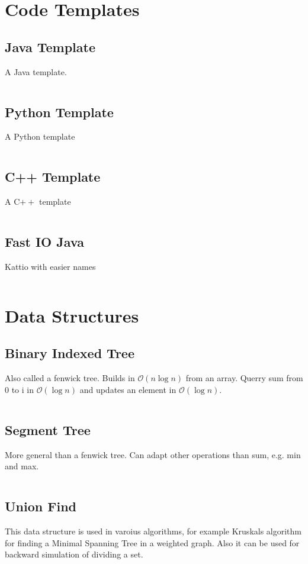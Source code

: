 \documentclass[8pt,a4paper,landscape,oneside]{amsart}
\newcommand{\code}[1]{\inputminted[fontsize=\normalsize,baselinestretch=1]{cpp}{code/#1}}
\newcommand{\bigO}{\mathcal{O}}
\begin{document}
\begin{multicols*}{3}
\thispagestyle{fancy}
\vspace{-3em}

\tableofcontents
\section{Code Templates}
    \subsection{Java Template}
        A Java template.
        \code{template.java}
    \subsection{Python Template}
        A Python template
        \code{template.py}
    \subsection{C++ Template}
        A C$++$ template
        \code{template.cpp}
    \subsection{Fast IO Java}
        Kattio with easier names
        \code{fastio.java}

\section{Data Structures}
    \subsection{Binary Indexed Tree}
        Also called a fenwick tree. Builds in $\bigO(n \log{n})$ from an array. Querry sum from 0 to i in $\bigO(\log{n})$ and updates an element in $\bigO(\log{n})$.
        \code{DS/BIT.java}
    \subsection{Segment Tree}
        More general than a fenwick tree. Can adapt other operations than sum, e.g. min and max.
        \code{DS/ST.java}
    \subsection{Union Find}
        This data structure is used in varoius algorithms, for example Kruskals algorithm for finding a Minimal Spanning Tree in a weighted graph. Also it can be used for backward simulation of dividing a set.
        \code{DS/UF.java}

\end{multicols*}
\end{document}
